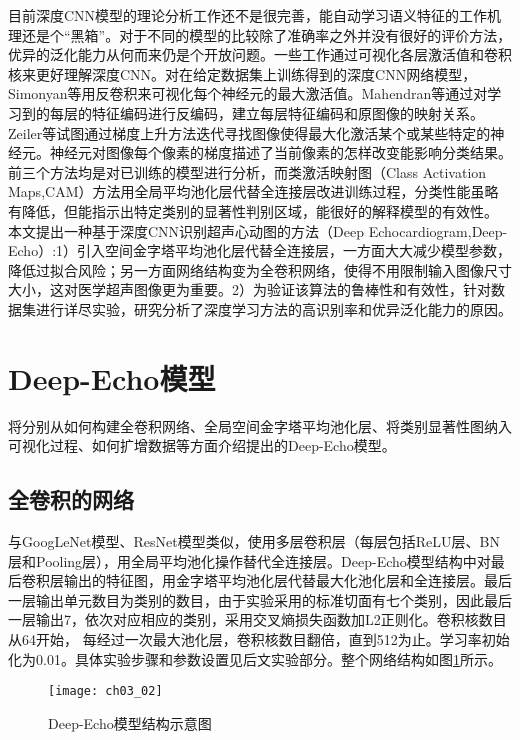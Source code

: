 目前深度CNN模型的理论分析工作还不是很完善，能自动学习语义特征的工作机理还是个“黑箱”。对于不同的模型的比较除了准确率之外并没有很好的评价方法，优异的泛化能力从何而来仍是个开放问题。一些工作\citep{simonyan14deep,Mahendran2015,Zeiler2014,Zhou2015}通过可视化各层激活值和卷积核来更好理解深度CNN。对在给定数据集上训练得到的深度CNN网络模型，Simonyan等\citep{simonyan14deep}用反卷积来可视化每个神经元的最大激活值。Mahendran等\citep{Mahendran2015}通过对学习到的每层的特征编码进行反编码，建立每层特征编码和原图像的映射关系。Zeiler等\citep{Zeiler2014}试图通过梯度上升方法迭代寻找图像使得最大化激活某个或某些特定的神经元。神经元对图像每个像素的梯度描述了当前像素的怎样改变能影响分类结果。前三个方法均是对已训练的模型进行分析，而类激活映射图（Class Activation Maps,CAM）方法\citep{Zhou2015}用全局平均池化层代替全连接层改进训练过程，分类性能虽略有降低，但能指示出特定类别的显著性判别区域，能很好的解释模型的有效性。
本文提出一种基于深度CNN识别超声心动图的方法（Deep Echocardiogram,Deep-Echo）:1）引入空间金字塔平均池化层代替全连接层，一方面大大减少模型参数，降低过拟合风险；另一方面网络结构变为全卷积网络，使得不用限制输入图像尺寸大小，这对医学超声图像更为重要。2）为验证该算法的鲁棒性和有效性，针对数据集进行详尽实验，研究分析了深度学习方法的高识别率和优异泛化能力的原因。
 
\section{Deep-Echo模型}

将分别从如何构建全卷积网络、全局空间金字塔平均池化层、将类别显著性图纳入可视化过程、如何扩增数据等方面介绍提出的Deep-Echo模型。
\subsection{全卷积的网络}

与GoogLeNet模型\citep{Szegedy2015}、ResNet模型\citep{he15}类似，使用多层卷积层（每层包括ReLU层、BN层和Pooling层），用全局平均池化操作替代全连接层。Deep-Echo模型结构中对最后卷积层输出的特征图，用金字塔平均池化层\citep{He2015spp}代替最大化池化层和全连接层。最后一层输出单元数目为类别的数目，由于实验采用的标准切面有七个类别，因此最后一层输出7，依次对应相应的类别，采用交叉熵损失函数加L2正则化。卷积核数目从64开始， 每经过一次最大池化层，卷积核数目翻倍，直到512为止。学习率初始化为0.01。具体实验步骤和参数设置见后文实验部分。整个网络结构如图\ref{fig:ch03_02}所示。

\begin{figure}[!htbp]
\centering
\texttt{[image: ch03\_02]}
\caption{Deep-Echo模型结构示意图}
\label{fig:ch03_02}
\end{figure}

